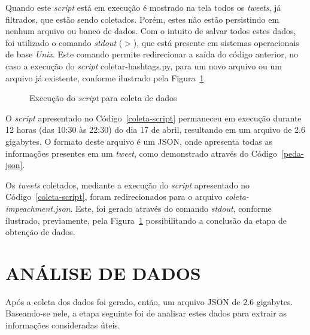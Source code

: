 Quando este \textit{script} está em execução é mostrado na tela todos os \textit{tweets}, já filtrados, que estão sendo coletados. Porém, estes não estão persistindo em nenhum arquivo ou banco de dados. Com o intuito de salvar todos estes dados, foi utilizado o comando \textit{stdout} ($>$), que está presente em sistemas operacionais de base \textit{Unix}. Este comando permite redirecionar a saída do código anterior, no caso a execução do \textit{script} coletar-hashtags.py, para um novo arquivo ou um arquivo já existente, conforme ilustrado pela Figura~\ref{exec-coleta}.

\begin{figure}[h]
	\centering
    \vspace{0.1cm}
	\caption{Execução do \textit{script} para coleta de dados}
	\label{exec-coleta}
\end{figure}

O \textit{script} apresentado no Código~\ref{coleta-script} permaneceu em execução durante 12 horas (das 10:30 às 22:30) do dia 17 de abril, resultando em um arquivo de 2.6 gigabytes. O formato deste arquivo é um JSON, onde apresenta todas as informações presentes em um \textit{tweet}, como demonstrado através do Código~\ref{peda-json}.



Os \textit{tweets} coletados, mediante a execução do \textit{script} apresentado no Código~\ref{coleta-script}, foram redirecionados para o arquivo \textit{coleta-impeachment.json}. Este, foi gerado através do comando \textit{stdout}, conforme ilustrado, previamente, pela Figura~\ref{exec-coleta} possibilitando a conclusão da etapa de obtenção de dados.

\section{ANÁLISE DE DADOS}
Após a coleta dos dados foi gerado, então, um arquivo JSON de 2.6 gigabytes. Baseando-se nele, a etapa seguinte foi de analisar estes dados para extrair as informações consideradas úteis.

